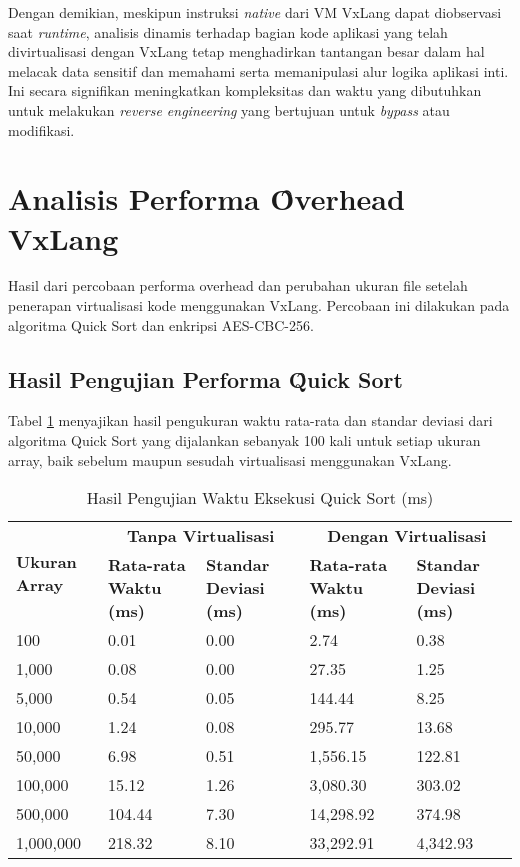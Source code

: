 Dengan demikian, meskipun instruksi \textit{native} dari VM VxLang dapat diobservasi saat \textit{runtime}, analisis dinamis terhadap bagian kode aplikasi yang telah divirtualisasi dengan VxLang tetap menghadirkan tantangan besar dalam hal melacak data sensitif dan memahami serta memanipulasi alur logika aplikasi inti. Ini secara signifikan meningkatkan kompleksitas dan waktu yang dibutuhkan untuk melakukan \textit{reverse engineering} yang bertujuan untuk \textit{bypass} atau modifikasi.

\section{Analisis Performa \f{Overhead} VxLang}
Hasil dari percobaan performa overhead dan perubahan ukuran file setelah penerapan virtualisasi kode menggunakan VxLang. Percobaan ini dilakukan pada algoritma Quick Sort dan enkripsi AES-CBC-256.

\subsection{Hasil Pengujian Performa \f{Quick Sort}}
Tabel \ref{tab:quick_sort_performance} menyajikan hasil pengukuran waktu rata-rata dan standar deviasi dari algoritma Quick Sort yang dijalankan sebanyak 100 kali untuk setiap ukuran array, baik sebelum maupun sesudah virtualisasi menggunakan VxLang. 

\begin{table}[H] %
    \centering
    \caption{Hasil Pengujian Waktu Eksekusi Quick Sort (ms)}
    \label{tab:quick_sort_performance}
    \begin{tabularx}{\textwidth}{@{}|X|X|X|X|X|@{}}
    \hline
        \multirow{2}{*}{\textbf{Ukuran Array}} & \multicolumn{2}{c|}{\textbf{Tanpa Virtualisasi}} & \multicolumn{2}{c|}{\textbf{Dengan Virtualisasi}}\\
        \cline{2-5}
        & \textbf{Rata-rata Waktu (ms)} & \textbf{Standar Deviasi (ms)} & \textbf{Rata-rata Waktu (ms)} & \textbf{Standar Deviasi (ms)}\\
        \hline
        100                     & 0.01 & 0.00 & 2.74 & 0.38 \\
        \hline
        1,000                   & 0.08 & 0.00 & 27.35 & 1.25 \\
        \hline
        5,000                   & 0.54 & 0.05 & 144.44 & 8.25 \\
        \hline
        10,000                  & 1.24 & 0.08 & 295.77 & 13.68 \\
        \hline
        50,000                  & 6.98 & 0.51 & 1,556.15 & 122.81 \\
        \hline
        100,000                 & 15.12 & 1.26 & 3,080.30 & 303.02 \\
        \hline
        500,000                 & 104.44 & 7.30 & 14,298.92 & 374.98 \\
        \hline
        1,000,000               & 218.32 & 8.10 & 33,292.91 & 4,342.93 \\
        \hline
    \end{tabularx}
\end{table}

